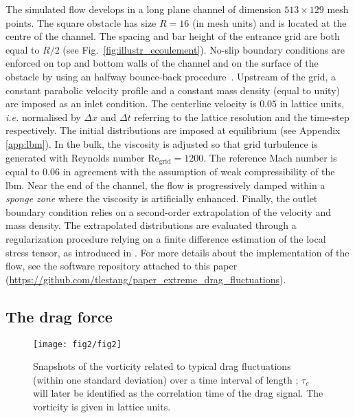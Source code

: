 %
The simulated flow develops in a long plane channel of dimension $513 \times 129$ mesh points. The square obstacle has size $R=16$ (in mesh units) and is located at the centre of the channel. The spacing and bar height of the entrance grid are both equal to $R/2$ (see Fig.~\ref{fig:illustr_ecoulement}). 
%
No-slip boundary conditions are enforced on top and bottom walls of the channel and on the surface of the obstacle by using an halfway bounce-back procedure~\citep{lbm_book}.  
%
Upstream of the grid, a constant parabolic velocity profile and a constant mass density (equal to unity) are imposed as an inlet condition. 
The centerline velocity is $0.05$ in lattice units, \textit{i.e.} normalised by $\Delta x$ and $\Delta t$ referring to the lattice resolution and the time-step respectively. The initial distributions are imposed at equilibrium (see Appendix \ref{app:lbm}). 
In the bulk, the viscosity is adjusted so that grid turbulence is generated with Reynolds number $\mathrm{Re_{grid}}=1200$. The reference Mach number is equal to $0.06$ in agreement with the assumption of weak compressibility of the \ac{lbm}. 
Near the end of the channel, the flow is progressively damped within a \textit{sponge zone} where the viscosity is artificially enhanced.
Finally, the outlet boundary condition relies on a second-order extrapolation of the velocity and mass density.
The extrapolated distributions are evaluated through a regularization procedure relying on a finite difference estimation of the local stress tensor, as introduced in \citep{latt2008straight}. For more details about the implementation of the flow, see the software repository attached to this paper (\url{https://github.com/tlestang/paper_extreme_drag_fluctuations}).


\subsection{The drag force}
\label{sec:drag_force}

\begin{figure}
	\centering
	\texttt{[image: fig2/fig2]}
	\caption{Snapshots of the vorticity related to typical drag fluctuations (within one standard deviation) over a time interval of length ; $\tau_c$ will later be identified as the correlation time of the drag signal.
		The vorticity is given in lattice units.}
	\label{fig:typical_vorticity}
\end{figure}

